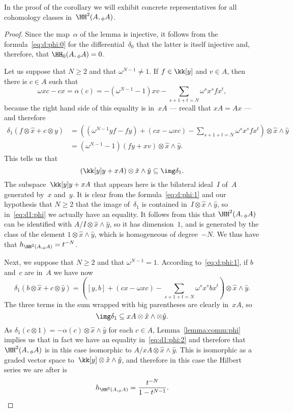 In the proof of the corollary we will exhibit concrete
representatives for all cohomology classes in~$\HH^2(A,{}_\phi A)$.

\begin{proof}
Since the map~$\alpha$ of the lemma is injective, it follows 
from the formula~\eqref{eq:d:phi:0} for the differential~$\delta_0$ that
the latter is itself injective and, therefore, that $\HH_0(A,{}_\phi A)=0$.

Let us suppose that $N\geq2$ and that $\omega^{N-1}\neq1$. If
$f\in\kk[y]$ and $v\in A$, then there is $c\in A$ such that
  \[
  \omega xc-cx 
        = \alpha(c) 
        = - (\omega^{N-1}-1)xv - \sum_{s+1+t=N}\omega^sx^sfx^t,
  \]
because the right hand side of this equality is in~$xA$ --- recall that
$xA=Ax$ --- and therefore
  \begin{align}
  \delta_1(f\otimes\hat x+c\otimes y) 
    &= \left(
        (\omega^{N-1}yf-fy) 
        + (cx-\omega xc) 
        - \sum_{s+1+t=N}\omega^sx^sfx^t
        \right)
       \otimes\hat x\wedge\hat y \\
    &= (\omega^{N-1}-1)(fy + xv) \otimes\hat x\wedge\hat y.
  \end{align}
This tells us that 
  \[ \label{eq:d1:phi}
  (\kk[y]y+xA)\otimes\hat x\wedge\hat y\subseteq\img\delta_1.
  \]
The subspace~$\kk[y]y+xA$ that appears here is the bilateral ideal~$I$ of~$A$
generated by~$x$ and~$y$. It is clear from the formula~\eqref{eq:d:phi:1}
and our hypothesis that $N\geq2$ that the image of~$\delta_1$ is contained
in~$I\otimes\hat x\wedge\hat y$, so in~\eqref{eq:d1:phi} we actually have
an equality. It follows from this that $\HH^2(A,{}_\phi A)$ can be
identified with $A/I\otimes\hat x\wedge\hat y$, so it has dimension~$1$,
and is generated by the class of the element $1\otimes\hat x\wedge\hat y$,
which is homogeneous of degree~$-N$. We thus have that
$h_{\HH^2(A,{}_\phi A)} = t^{-N}$.

Next, we suppose that $N\geq2$ and that $\omega^{N-1}=1$. According
to~\eqref{eq:d:phi:1}, if $b$ and~$c$ are in~$A$ we have now
  \[
  \delta_1(b\otimes\hat x+c\otimes\hat y)  =
    \left([y,b] + (cx-\omega xc) - \sum_{s+1+t=N}\omega^sx^sbx^t\right)
    \otimes\hat x\wedge\hat y.
  \]
The three terms in the sum wrapped with big parentheses are clearly in~$xA$,
so 
  \[ \label{eq:d1:phi:2}
  \img\delta_1 \subseteq xA\otimes\hat x\wedge\otimes\hat y.
  \]
As $\delta_1(c\otimes 1)=-\alpha(c)\otimes\hat x\wedge\hat y$ for each $c\in
A$, Lemma~\ref{lemma:comm:phi} implies us that in fact we have an equality
in~\eqref{eq:d1:phi:2} and therefore that $\HH^2(A,{}_\phi A)$ is in this
case isomorphic to $A/xA\otimes\hat x\wedge\hat y$. This is isomorphic as a
graded vector space to~$\kk[y]\otimes\hat x\wedge\hat y$, and therefore in
this case the Hilbert series we are after is
  \[
  h_{\HH^2(A,{}_\phi A)} = \frac{t^{-N}}{1-t^{N-1}}.
  \]


\end{proof}
